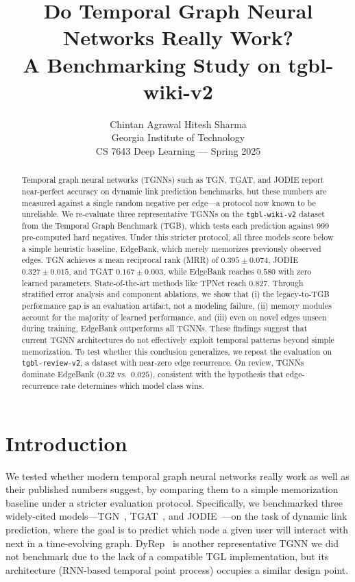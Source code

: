 \documentclass[10pt,twocolumn]{article}
\title{Do Temporal Graph Neural Networks Really Work?\\
A Benchmarking Study on tgbl-wiki-v2}
\author{
Chintan Agrawal \quad Hitesh Sharma\\
Georgia Institute of Technology\\
{\small CS 7643 Deep Learning --- Spring 2025}
}
\date{}
\begin{document}
\maketitle

\begin{abstract}
Temporal graph neural networks (TGNNs) such as TGN, TGAT, and JODIE report near-perfect accuracy on dynamic link prediction benchmarks, but these numbers are measured against a single random negative per edge---a protocol now known to be unreliable.
We re-evaluate three representative TGNNs on the \texttt{tgbl-wiki-v2} dataset from the Temporal Graph Benchmark (TGB), which tests each prediction against 999 pre-computed hard negatives.
Under this stricter protocol, all three models score below a simple heuristic baseline, EdgeBank, which merely memorizes previously observed edges.
TGN achieves a mean reciprocal rank (MRR) of $0.395 \pm 0.074$, JODIE $0.327 \pm 0.015$, and TGAT $0.167 \pm 0.003$, while EdgeBank reaches $0.580$ with zero learned parameters.
State-of-the-art methods like TPNet reach $0.827$.
Through stratified error analysis and component ablations, we show that (i) the legacy-to-TGB performance gap is an evaluation artifact, not a modeling failure, (ii) memory modules account for the majority of learned performance, and (iii) even on novel edges unseen during training, EdgeBank outperforms all TGNNs.
These findings suggest that current TGNN architectures do not effectively exploit temporal patterns beyond simple memorization.
To test whether this conclusion generalizes, we repeat the evaluation on \texttt{tgbl-review-v2}, a dataset with near-zero edge recurrence.
On review, TGNNs dominate EdgeBank ($0.32$ vs.\ $0.025$), consistent with the hypothesis that edge-recurrence rate determines which model class wins.
\end{abstract}

\section{Introduction}

We tested whether modern temporal graph neural networks really work as well as their published numbers suggest, by comparing them to a simple memorization baseline under a stricter evaluation protocol.
Specifically, we benchmarked three widely-cited models---TGN~\cite{rossi2020tgn}, TGAT~\cite{xu2020tgat}, and JODIE~\cite{kumar2019jodie}---on the task of dynamic link prediction, where the goal is to predict which node a given user will interact with next in a time-evolving graph.
DyRep~\cite{trivedi2019dyrep} is another representative TGNN we did not benchmark due to the lack of a compatible TGL implementation, but its architecture (RNN-based temporal point process) occupies a similar design point.
\end{document}
